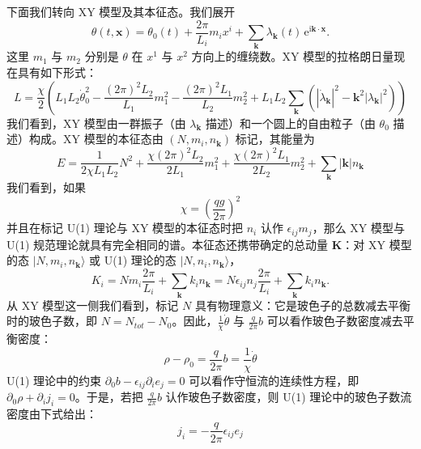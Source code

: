 
下面我们转向 XY 模型及其本征态。我们展开
\begin{equation*}
\theta(t,\pmb{x})=\theta_{0}(t)+\frac{2\pi}{L_{i}}m_{i}x^{i}+\sum_{\pmb{k}}\lambda_{\pmb{k}}(t)\,\mathrm{e}^{\mathrm{i}\pmb{k}\cdot\pmb{x}}.
\end{equation*}
这里 $m_{1}$ 与 $m_{2}$ 分别是 $\theta$ 在 $x^{1}$ 与 $x^{2}$ 方向上的缠绕数。XY 模型的拉格朗日量现在具有如下形式：
\begin{equation*}
L=\frac{\chi}{2}\left(L_{1}L_{2}\dot{\theta}_{0}^{2}-\frac{(2\pi)^{2}L_{2}}{L_{1}}m_{1}^{2}-\frac{(2\pi)^{2}L_{1}}{L_{2}}m_{2}^{2}+L_{1}L_{2}\sum_{\pmb{k}}\left(|\dot{\lambda}_{\pmb{k}}|^{2}-\pmb{k}^{2}|\lambda_{\pmb{k}}|^{2}\right)\right)
\end{equation*}
我们看到，XY 模型由一群振子（由 $\lambda_{\pmb{k}}$ 描述）和一个圆上的自由粒子（由 $\theta_{0}$ 描述）构成。XY 模型的本征态由 $(N,m_{i},n_{\pmb{k}})$ 标记，其能量为
\begin{equation*}
E=\frac{1}{2\chi L_{1}L_{2}}N^{2}+\frac{\chi(2\pi)^{2}L_{2}}{2L_{1}}m_{1}^{2}+\frac{\chi(2\pi)^{2}L_{1}}{2L_{2}}m_{2}^{2}+\sum_{\pmb{k}}|\pmb{k}|n_{\pmb{k}} \tag{6.3.8}
\end{equation*}
我们看到，如果
\begin{equation*}
\chi=\left(\frac{qg}{2\pi}\right)^{2}
\end{equation*}
并且在标记 U(1) 理论与 XY 模型的本征态时把 $n_{i}$ 认作 $\epsilon_{ij}m_{j}$，那么 XY 模型与 U(1) 规范理论就具有完全相同的谱。本征态还携带确定的总动量 $\pmb{K}$：对 XY 模型的态 $|N,m_{i},n_{\pmb{k}}\rangle$ 或 U(1) 理论的态 $|N,n_{i},n_{\pmb{k}}\rangle$，
\begin{equation*}
K_{i}=Nm_{i}\frac{2\pi}{L_{i}}+\sum_{\pmb{k}}k_{i}n_{\pmb{k}}=N\epsilon_{ij}n_{j}\frac{2\pi}{L_{i}}+\sum_{\pmb{k}}k_{i}n_{\pmb{k}}.
\end{equation*}
从 XY 模型这一侧我们看到，标记 $N$ 具有物理意义：它是玻色子的总数减去平衡时的玻色子数，即 $N=N_{tot}-N_{0}$。因此，$\frac{1}{\chi}\dot{\theta}$ 与 $\frac{q}{2\pi}b$ 可以看作玻色子数密度减去平衡密度：
\begin{equation*}
\rho-\rho_{0}=\frac{q}{2\pi}b=\frac{1}{\chi}\dot{\theta}
\end{equation*}
U(1) 理论中的约束 $\partial_{0}b-\epsilon_{ij}\partial_{i}e_{j}=0$ 可以看作守恒流的连续性方程，即 $\partial_{0}\rho+\partial_{i}j_{i}=0$。于是，若把 $\frac{q}{2\pi}b$ 认作玻色子数密度，则 U(1) 理论中的玻色子数流密度由下式给出：
\begin{equation*}
j_{i}=-\frac{q}{2\pi}\epsilon_{ij}e_{j}
\end{equation*}

